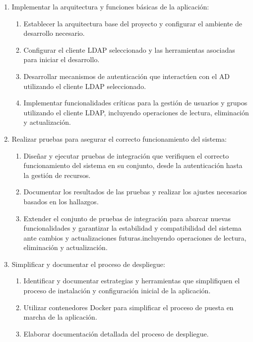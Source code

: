 \begin{enumerate}[label=\arabic*., itemindent=*, leftmargin=*]
    \item Implementar la arquitectura y funciones básicas de la aplicación:
          \begin{enumerate}[label=\arabic{enumi}.\arabic*., leftmargin=*]
              \item Establecer la arquitectura base del proyecto y configurar el ambiente de desarrollo necesario.
              \item Configurar el cliente LDAP seleccionado y las herramientas asociadas para iniciar el desarrollo.
              \item Desarrollar mecanismos de autenticación que interactúen con el AD utilizando el cliente LDAP seleccionado.
              \item Implementar funcionalidades críticas para la gestión de usuarios y grupos utilizando el cliente LDAP, incluyendo operaciones de lectura, eliminación y actualización.
          \end{enumerate}



    \item Realizar pruebas para asegurar el correcto funcionamiento del sistema:
          \begin{enumerate}[label=\arabic{enumi}.\arabic*., leftmargin=*]
              \item Diseñar y ejecutar pruebas de integración que verifiquen el correcto funcionamiento del sistema en su conjunto, desde la autenticación hasta la gestión de recursos.
              \item Documentar los resultados de las pruebas y realizar los ajustes necesarios basados en los hallazgos.
              \item Extender el conjunto de pruebas de integración para abarcar nuevas funcionalidades y garantizar la estabilidad y compatibilidad del sistema ante cambios y actualizaciones futuras.incluyendo operaciones de lectura, eliminación y actualización.
          \end{enumerate}

    \item Simplificar y documentar el proceso de despliegue:
          \begin{enumerate}[label=\arabic{enumi}.\arabic*., leftmargin=*]
              \item Identificar y documentar estrategias y herramientas que simplifiquen el proceso de instalación y configuración inicial de la aplicación.
              \item Utilizar contenedores Docker para simplificar el proceso de puesta en marcha de la aplicación.
              \item Elaborar documentación detallada del proceso de despliegue.
          \end{enumerate}


\end{enumerate}
